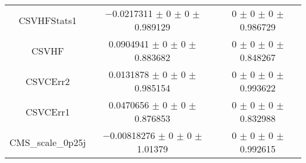 \begin{table}
\begin{tabular}{ccc}
CSVHFStats1 	& \num{-0.0217311} $\pm$ \num{0} $\pm$ \num{0} $\pm$ \num{0.989129} 	& \num{0} $\pm$ \num{0} $\pm$ \num{0} $\pm$ \num{0.986729}\\
CSVHF 	& \num{0.0904941} $\pm$ \num{0} $\pm$ \num{0} $\pm$ \num{0.883682} 	& \num{0} $\pm$ \num{0} $\pm$ \num{0} $\pm$ \num{0.848267}\\
CSVCErr2 	& \num{0.0131878} $\pm$ \num{0} $\pm$ \num{0} $\pm$ \num{0.985154} 	& \num{0} $\pm$ \num{0} $\pm$ \num{0} $\pm$ \num{0.993622}\\
CSVCErr1 	& \num{0.0470656} $\pm$ \num{0} $\pm$ \num{0} $\pm$ \num{0.876853} 	& \num{0} $\pm$ \num{0} $\pm$ \num{0} $\pm$ \num{0.832988}\\
CMS\_scale\_0p25j 	& \num{-0.00818276} $\pm$ \num{0} $\pm$ \num{0} $\pm$ \num{1.01379} 	& \num{0} $\pm$ \num{0} $\pm$ \num{0} $\pm$ \num{0.992615}\\
\bottomrule
\end{tabular}
\end{table}